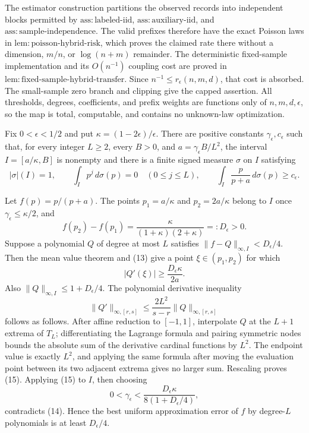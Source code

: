 The estimator construction partitions the observed records into independent blocks permitted by \(\mathrm{ass:labeled\mbox{-}iid}\), \(\mathrm{ass:auxiliary\mbox{-}iid}\), and \(\mathrm{ass:sample\mbox{-}independence}\).  The valid prefixes therefore have the exact Poisson laws in \(\mathrm{lem:poisson\mbox{-}hybrid\mbox{-}risk}\), which proves the claimed rate there without a dimension, \(m/n\), or \(\log(n+m)\) remainder.  The deterministic fixed-sample implementation and its \(O(n^{-1})\) coupling cost are proved in \(\mathrm{lem:fixed\mbox{-}sample\mbox{-}hybrid\mbox{-}transfer}\).  Since \(n^{-1}\le r_\epsilon(n,m,d)\), that cost is absorbed.  The small-sample zero branch and clipping give the capped assertion.  All thresholds, degrees, coefficients, and prefix weights are functions only of \(n,m,d,\epsilon\), so the map is total, computable, and contains no unknown-law optimization.

Fix \(0<\epsilon<1/2\) and put \(\kappa=(1-2\epsilon)/\epsilon\).  There are positive constants \(\gamma_\epsilon,c_\epsilon\) such that, for every integer \(L\ge2\), every \(B>0\), and \(a=\gamma_\epsilon B/L^2\), the interval \(I=[a/\kappa,B]\) is nonempty and there is a finite signed measure \(\sigma\) on \(I\) satisfying
\[
 |\sigma|(I)=1,\qquad \int_Ip^j\,d\sigma(p)=0\quad(0\le j\le L),
 \qquad \int_I\frac p{p+a}\,d\sigma(p)\ge c_\epsilon.
\]

Let \(f(p)=p/(p+a)\).  The points \(p_1=a/\kappa\) and \(p_2=2a/\kappa\) belong to \(I\) once \(\gamma_\epsilon\le\kappa/2\), and
\[
 f(p_2)-f(p_1)=\frac{\kappa}{(1+\kappa)(2+\kappa)}=:D_\epsilon>0. \tag{13}
\]
Suppose a polynomial \(Q\) of degree at most \(L\) satisfies \(\|f-Q\|_{\infty,I}<D_\epsilon/4\).  Then the mean value theorem and (13) give a point \(\xi\in(p_1,p_2)\) for which
\[
 |Q'(\xi)|\ge \frac{D_\epsilon\kappa}{2a}. \tag{14}
\]
Also \(\|Q\|_{\infty,I}\le1+D_\epsilon/4\).  The polynomial derivative inequality
\[
 \|Q'\|_{\infty,[r,s]}\le \frac{2L^2}{s-r}\|Q\|_{\infty,[r,s]} \tag{15}
\]
follows as follows.  After affine reduction to \([-1,1]\), interpolate \(Q\) at the \(L+1\) extrema of \(T_L\); differentiating the Lagrange formula and pairing symmetric nodes bounds the absolute sum of the derivative cardinal functions by \(L^2\).  The endpoint value is exactly \(L^2\), and applying the same formula after moving the evaluation point between its two adjacent extrema gives no larger sum.  Rescaling proves (15).  Applying (15) to \(I\), then choosing
\[
 0<\gamma_\epsilon<\frac{D_\epsilon\kappa}{8(1+D_\epsilon/4)},
\]
contradicts (14).  Hence the best uniform approximation error of \(f\) by degree-\(L\) polynomials is at least \(D_\epsilon/4\).

